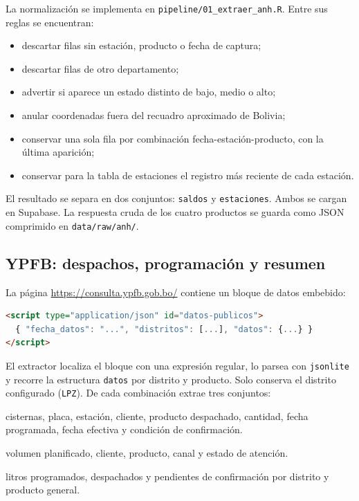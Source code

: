 \documentclass[12pt,a4paper]{article}
\newcommand{\archivo}[1]{\texttt{#1}}
\begin{document}
La normalización se implementa en \archivo{pipeline/01\_extraer\_anh.R}. Entre sus reglas se encuentran:
\begin{itemize}[leftmargin=1.2cm]
  \item descartar filas sin estación, producto o fecha de captura;
  \item descartar filas de otro departamento;
  \item advertir si aparece un estado distinto de bajo, medio o alto;
  \item anular coordenadas fuera del recuadro aproximado de Bolivia;
  \item conservar una sola fila por combinación fecha-estación-producto, con la última aparición;
  \item conservar para la tabla de estaciones el registro más reciente de cada estación.
\end{itemize}

El resultado se separa en dos conjuntos: \texttt{saldos} y \texttt{estaciones}. Ambos se cargan en Supabase. La respuesta cruda de los cuatro productos se guarda como JSON comprimido en \texttt{data/raw/anh/}.

\subsection{YPFB: despachos, programación y resumen}

La página \url{https://consulta.ypfb.gob.bo/} contiene un bloque de datos embebido:

\begin{lstlisting}[language=HTML,caption={Estructura del bloque de datos de YPFB (extracto).}]
<script type="application/json" id="datos-publicos">
  { "fecha_datos": "...", "distritos": [...], "datos": {...} }
</script>
\end{lstlisting}

El extractor localiza el bloque con una expresión regular, lo parsea con \texttt{jsonlite} y recorre la estructura \texttt{datos} por distrito y producto. Solo conserva el distrito configurado (\texttt{LPZ}). De cada combinación extrae tres conjuntos:
\begin{description}[leftmargin=1.2cm]
  \item[Despachos:] cisternas, placa, estación, cliente, producto despachado, cantidad, fecha programada, fecha efectiva y condición de confirmación.
  \item[Programación:] volumen planificado, cliente, producto, canal y estado de atención.
  \item[Resumen:] litros programados, despachados y pendientes de confirmación por distrito y producto general.
\end{description}
\end{document}
